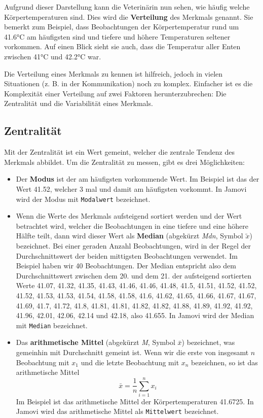 \documentclass[
]{book}
\providecommand{\tightlist}{%
  \setlength{\itemsep}{0pt}\setlength{\parskip}{0pt}}
\theoremstyle{definition}
\theoremstyle{definition}
\theoremstyle{definition}
\theoremstyle{definition}
\theoremstyle{remark}
\begin{document}
Aufgrund dieser Darstellung kann die Veterinärin nun sehen, wie häufig welche Körpertemperaturen sind. Dies wird die \textbf{Verteilung} des Merkmals genannt. Sie bemerkt zum Beispiel, dass Beobachtungen der Körpertemperatur rund um 41.6°C am häufigsten sind und tiefere und höhere Temperaturen seltener vorkommen. Auf einen Blick sieht sie auch, dass die Temperatur aller Enten zwischen 41°C und 42.2°C war.

Die Verteilung eines Merkmals zu kennen ist hilfreich, jedoch in vielen Situationen (z. B. in der Kommunikation) noch zu komplex. Einfacher ist es die Komplexität einer Verteilung auf zwei Faktoren herunterzubrechen: Die Zentralität und die Variabilität eines Merkmals.

\subsection{Zentralität}\label{zentralitaet}

Mit der Zentralität ist ein Wert gemeint, welcher die zentrale Tendenz des Merkmals abbildet. Um die Zentralität zu messen, gibt es drei Möglichkeiten:

\begin{itemize}
\tightlist
\item
  \label{customdef-modus}{Der \textbf{Modus} ist der am häufigsten vorkommende Wert.} Im Beispiel ist das der Wert 41.52, welcher 3 mal und damit am häufigsten vorkommt. In Jamovi wird der Modus mit \texttt{Modalwert} bezeichnet.
\item
  \label{customdef-median}{Wenn die Werte des Merkmals aufsteigend sortiert werden und der Wert betrachtet wird, welcher die Beobachtungen in eine tiefere und eine höhere Hälfte teilt, dann wird dieser Wert als \textbf{Median} (abgekürzt \emph{Mdn}, Symbol \(\tilde{x}\)) bezeichnet.} Bei einer geraden Anzahl Beobachtungen, wird in der Regel der Durchschnittswert der beiden mittigsten Beobachtungen verwendet. Im Beispiel haben wir 40 Beobachtungen. Der Median entspricht also dem Durchschnittswert zwischen dem 20. und dem 21. der aufsteigend sortierten Werte 41.07, 41.32, 41.35, 41.43, 41.46, 41.46, 41.48, 41.5, 41.51, 41.52, 41.52, 41.52, 41.53, 41.53, 41.54, 41.58, 41.58, 41.6, 41.62, 41.65, 41.66, 41.67, 41.67, 41.69, 41.7, 41.72, 41.8, 41.81, 41.81, 41.82, 41.82, 41.88, 41.89, 41.92, 41.92, 41.96, 42.01, 42.06, 42.14 und 42.18, also 41.655. In Jamovi wird der Median mit \texttt{Median} bezeichnet.
\item
  \label{customdef-arithmetisches-mittel}{Das \textbf{arithmetische Mittel} (abgekürzt \emph{M}, Symbol \(\bar{x}\)) bezeichnet, was gemeinhin mit Durchschnitt gemeint ist.} Wenn wir die erste von insgesamt \(n\) Beobachtung mit \(x_1\) und die letzte Beobachtung mit \(x_n\) bezeichnen, so ist das arithmetische Mittel
  \begin{equation}
  \bar{x} = \frac{1}{n}\sum^n_{i=1} x_i
  \label{eq:mean}
  \end{equation}
  Im Beispiel ist das arithmetische Mittel der Körpertemperaturen 41.6725. In Jamovi wird das arithmetische Mittel als \texttt{Mittelwert} bezeichnet.
\end{itemize}
\end{document}
